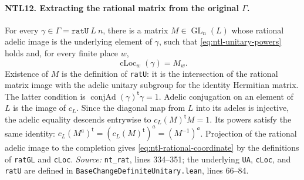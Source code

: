\paragraph{NTL12. Extracting the rational matrix from the original \(\Gamma\).}
\label{claim:NTL12}
For every \(\gamma\in\Gamma=\texttt{ratU}\ L\ n\), there is a
matrix \(M\in\operatorname{GL}_n(L)\) whose rational adelic image
is the underlying element of \(\gamma\), such that
\eqref{eq:ntl-unitary-powers} holds and, for every finite place \(w\),
\begin{equation}\label{eq:ntl-rational-coordinate}
 \operatorname{cLoc}_w(\gamma)=M_w.
\end{equation}
Existence of \(M\) is the definition of \texttt{ratU}: it is the
intersection of the rational matrix image with the adelic unitary
subgroup for the identity Hermitian matrix.  The latter condition
is \(\operatorname{conjAd}(\gamma)^{\mathsf t}\gamma=1\).
Adelic conjugation on an element of \(L\) is the image of \(c_L\).
Since the diagonal map from \(L\) into its adeles is injective,
the adelic equality descends entrywise to
\(c_L(M)^{\mathsf t}M=1\).  Its powers satisfy the same identity:
\(c_L(M^a)^{\mathsf t}=(c_L(M)^{\mathsf t})^a=(M^{-1})^a\).
Projection of the rational adelic image to the completion gives
\eqref{eq:ntl-rational-coordinate} by the definitions of
\texttt{ratGL} and \texttt{cLoc}.
\emph{Source:} \texttt{nt\_rat}, lines 334--351; the underlying
\texttt{UA}, \texttt{cLoc}, and \texttt{ratU} are defined in
\texttt{BaseChangeDefiniteUnitary.lean}, lines 66--84.

